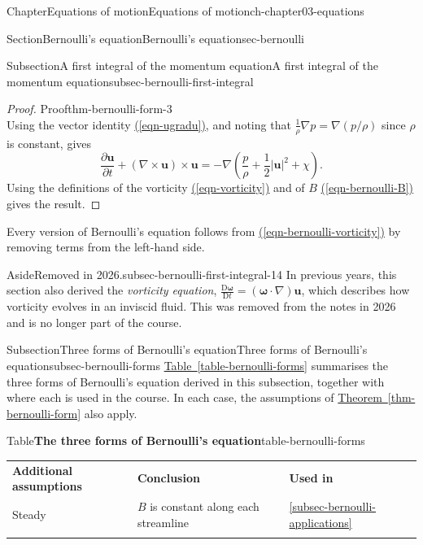 \documentclass[oneside,10pt,]{book}
\newcommand{\tabularfont}{\relax}
\newcommand{\xreffont}{\relax}
\numberwithin{equation}{section}
\newcommand{\ptxhrulethin}  {\noalign{\hrule height 0.04em}}
\newcommand{\ptxhrulethick} {\noalign{\hrule height 0.11em}}
\newcommand{\DD}[2]{\frac{\mathrm{D}#1}{\mathrm{D}#2}}
\newcommand{\pd}[2]{\frac{\partial#1}{\partial#2}}
\newcommand{\bu}{\boldsymbol{u}}
\newcommand{\bomega}{\boldsymbol{\omega}}
\begin{document}
\begin{chapterptx}{Chapter}{Equations of motion}{}{Equations of motion}{}{}{ch-chapter03-equations}
\begin{sectionptx}{Section}{Bernoulli's equation}{}{Bernoulli's equation}{}{}{sec-bernoulli}
\begin{subsectionptx}{Subsection}{A first integral of the momentum equation}{}{A first integral of the momentum equation}{}{}{subsec-bernoulli-first-integral}
\begin{proof}{Proof}{}{thm-bernoulli-form-3}
\begin{equation*}
\end{equation*}
Using the vector identity \hyperref[eqn-ugradu]{({\xreffont\ref{eqn-ugradu}})}, and noting that \(\frac{1}{\rho}\nabla
p = \nabla(p/\rho)\) since \(\rho\) is constant, gives%
\begin{equation}
\pd{\bu}{t} + (\nabla \times \bu) \times \bu = - \nabla \left(\frac{p}{\rho} +
\frac{1}{2} |\bu|^2 + \chi\right).\label{eqn-bernoulli-unsteady-chap3}
\end{equation}
Using the definitions of the vorticity \hyperref[eqn-vorticity]{({\xreffont\ref{eqn-vorticity}})} and of \(B\) \hyperref[eqn-bernoulli-B]{({\xreffont\ref{eqn-bernoulli-B}})} gives the result.%
\end{proof}
Every version of Bernoulli's equation follows from \hyperref[eqn-bernoulli-vorticity]{({\xreffont\ref{eqn-bernoulli-vorticity}})} by removing terms from the left-hand side.%
\begin{aside}{Aside}{Removed in 2026.}{subsec-bernoulli-first-integral-14}%
In previous years, this section also derived the \emph{vorticity equation}, \(\DD{\bomega}{t}
= (\bomega \cdot \nabla)\bu\), which describes how vorticity evolves in an inviscid fluid. This was removed from the notes in 2026 and is no longer part of the course.%
\end{aside}
\end{subsectionptx}
%
%
\typeout{************************************************}
\typeout{************************************************}
%
\begin{subsectionptx}{Subsection}{Three forms of Bernoulli's equation}{}{Three forms of Bernoulli's equation}{}{}{subsec-bernoulli-forms}
\hyperref[table-bernoulli-forms]{Table~{\xreffont\ref{table-bernoulli-forms}}} summarises the three forms of Bernoulli's equation derived in this subsection, together with where each is used in the course. In each case, the assumptions of \hyperref[thm-bernoulli-form]{Theorem~{\xreffont\ref{thm-bernoulli-form}}} also apply.%
\begin{tableptx}{Table}{\textbf{The three forms of Bernoulli's equation}}{table-bernoulli-forms}{}%
\centering%
{\tabularfont%
\begin{tabular}{lll}\ptxhrulethick
{\bfseries{}Additional assumptions}&{\bfseries{}Conclusion}&{\bfseries{}Used in}\tabularnewline\ptxhrulethin
Steady&\(B\) is constant along each streamline&\hyperref[subsec-bernoulli-applications]{{\xreffont\ref{subsec-bernoulli-applications}}}\tabularnewline\ptxhrulethick

\end{tabular}}
\end{tableptx}
\end{subsectionptx}
\end{sectionptx}
\end{chapterptx}
\end{document}
